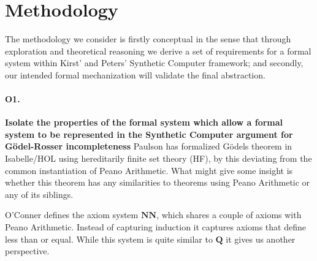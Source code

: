 \documentclass[a4paper]{scrartcl}
\begin{document}
\section{Methodology}
\label{sec:methodology}


The methodology we consider is firstly conceptual in the sense that through exploration and theoretical reasoning we derive a set of requirements for a formal system within Kirst' and Peters' Synthetic Computer framework; and secondly, our intended formal mechanization will validate the final abstraction.

\paragraph{O1.}
\textbf{Isolate the properties of the formal system which allow a formal system to be represented in the Synthetic Computer argument for Gödel-Rosser incompleteness}
Paulson has formalized Gödels theorem in Isabelle/HOL using hereditarily finite set theory (HF), by this deviating from the common instantiation of Peano Arithmetic. What might give some insight is whether this theorem has any similarities to theorems using Peano Arithmetic or any of its siblings. \cite{Paulson_2015}

O'Conner defines the axiom system $\mathbf{NN}$, which shares a couple of axioms with Peano Arithmetic.\cite{O_Connor_2005} Instead of capturing induction it captures axioms that define less than or equal. While this system is quite similar to $\mathbf{Q}$ it gives us another perspective.
\end{document}
